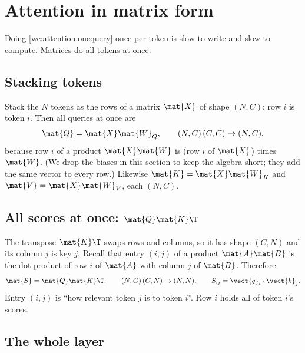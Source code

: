 \section{Attention in matrix form}\label{sec:attention:matrix}

Doing \cref{we:attention:onequery} once per token is slow to write and slow to compute. Matrices
do all tokens at once.

\subsection{Stacking tokens}

Stack the $N$ tokens as the rows of a matrix $\mat{X}$ of shape $(N, C)$; row $i$ is token $i$.
Then all queries at once are
\begin{equation}
  \mat{Q} = \mat{X}\mat{W}_Q,\qquad (N, C)\,(C, C) \to (N, C),
\end{equation}
because row $i$ of a product $\mat{X}\mat{W}$ is (row $i$ of $\mat{X}$) times $\mat{W}$. (We drop
the biases in this section to keep the algebra short; they add the same vector to every row.)
Likewise $\mat{K} = \mat{X}\mat{W}_K$ and $\mat{V} = \mat{X}\mat{W}_V$, each $(N, C)$.

\subsection{All scores at once: \texorpdfstring{$\mat{Q}\mat{K}\T$}{QK transpose}}

The transpose $\mat{K}\T$ swaps rows and columns, so it has shape $(C, N)$ and its column $j$ is
key $j$. Recall that entry $(i, j)$ of a product $\mat{A}\mat{B}$ is the dot product of row $i$ of
$\mat{A}$ with column $j$ of $\mat{B}$. Therefore
\begin{equation}\label{eq:attention:S}
  \mat{S} = \mat{Q}\mat{K}\T,\qquad (N, C)\,(C, N) \to (N, N),\qquad
  S_{ij} = \vect{q}_i\cdot\vect{k}_j .
\end{equation}
Entry $(i, j)$ is ``how relevant token $j$ is to token $i$''. Row $i$ holds all of token $i$'s
scores.

\subsection{The whole layer}

